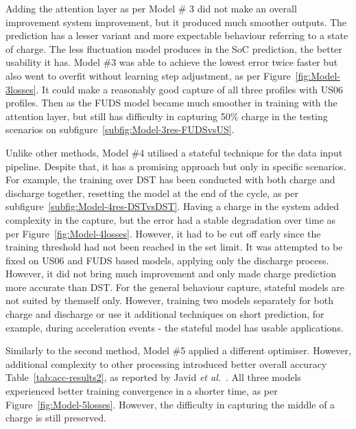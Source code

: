 %
%
Adding the attention layer as per Model \# 3 did not make an overall improvement system improvement, but it produced much smoother outputs.
The prediction has a lesser variant and more expectable behaviour referring to a state of charge.
The less fluctuation model produces in the SoC prediction, the better usability it has.
Model \#3 was able to achieve the lowest error twice faster but also went to overfit without learning step adjustment, as per Figure~\ref{fig:Model-3losses}.
It could make a reasonably good capture of all three profiles with US06 profiles.
Then as the FUDS model became much smoother in training with the attention layer, but still has difficulty in capturing 50\% charge in the testing scenarios on subfigure~\ref{subfig:Model-3res-FUDSvsUS}. 

%
%
Unlike other methods, Model \#4 utilised a stateful technique for the data input pipeline.
Despite that, it has a promising approach but only in specific scenarios.
For example, the training over DST has been conducted with both charge and discharge together, resetting the model at the end of the cycle, as per subfigure~\ref{subfig:Model-4res-DSTvsDST}.
Having a charge in the system added complexity in the capture, but the error had a stable degradation over time as per Figure~\ref{fig:Model-4losses}.
However, it had to be cut off early since the training threshold had not been reached in the set limit.
It was attempted to be fixed on US06 and FUDS based models, applying only the discharge process.
However, it did not bring much improvement and only made charge prediction more accurate than DST.
For the general behaviour capture, stateful models are not suited by themself only.
However, training two models separately for both charge and discharge or use it additional techniques on short prediction, for example, during acceleration events - the stateful model has usable applications.

%
%
Similarly to the second method, Model \#5 applied a different optimiser.
However, additional complexity to other processing introduced better overall accuracy Table~\ref{tab:acc-results2}, as reported by Javid \textit{et al.}~\cite{javid_adaptive_2020}.
All three models experienced better training convergence in a shorter time, as per Figure~\ref{fig:Model-5losses}.
However, the difficulty in capturing the middle of a charge is still preserved.


